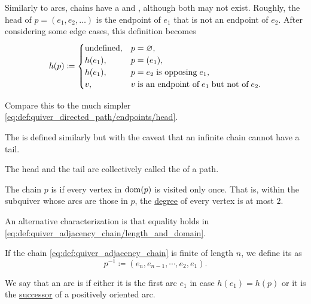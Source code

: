 \begin{definition}
\begin{thmenum}
     Similarly to arcs, chains have a  and , although both may not exist. Roughly, the head of \( p = (e_1, e_2, \ldots) \) is the endpoint of \( e_1 \) that is not an endpoint of \( e_2 \). After considering some edge cases, this definition becomes
    \begin{equation}\label{eq:def:quiver_adjacency_chain/endpoints/head}
      h(p) \coloneqq \begin{cases}
        \T{undefined}, &p = \varnothing, \\
        h(e_1),        &p = (e_1), \\
        h(e_1),        &p = e_2 \T{is opposing} e_1, \\
        v,             &v \T{is an endpoint of} e_1 \T{but not of} e_2.
      \end{cases}
    \end{equation}

    Compare this to the much simpler \eqref{eq:def:quiver_directed_path/endpoints/head}.

    The  is defined similarly but with the caveat that an infinite chain cannot have a tail.

    The head and the tail are collectively called the  of a path.

     The chain \( p \) is  if every vertex in \( \operatorname{dom}(p) \) is visited only once. That is, within the subquiver whose arcs are those in \( p \), the \hyperref[def:graph/degree]{degree} of every vertex is at most \( 2 \).

    An alternative characterization is that equality holds in \eqref{eq:def:quiver_adjacency_chain/length_and_domain}.

     If the chain \eqref{eq:def:quiver_adjacency_chain} is finite of length \( n \), we define its  as
    \begin{equation*}
      p^{-1} \coloneqq (e_n, e_{n-1}, \cdots, e_2, e_1).
    \end{equation*}

     We say that an arc is  if either it is the first arc \( e_1 \) in case \( h(e_1) = h(p) \) or it is the \hyperref[def:graph/adjacency]{successor} of a positively oriented arc.


\end{thmenum}
\end{definition}
